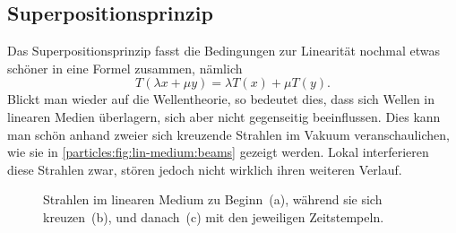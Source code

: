 \subsection{Superpositionsprinzip}\label{particles:section:lin-medium:superposition} %
Das Superpositionsprinzip fasst die Bedingungen zur Linearität nochmal etwas schöner in eine Formel zusammen, 
nämlich
\[
    T(\lambda x + \mu y)
    = 
    \lambda T(x) 
    + 
    \mu T(y).
\]
Blickt man wieder auf die Wellentheorie, so bedeutet dies, 
dass sich Wellen in linearen Medien überlagern, 
sich aber nicht gegenseitig beeinflussen.
Dies kann man schön anhand zweier sich kreuzende Strahlen im Vakuum veranschaulichen, 
wie sie in \autoref{particles:fig:lin-medium:beams} gezeigt werden.
Lokal interferieren diese Strahlen zwar, stören jedoch nicht wirklich ihren weiteren Verlauf.
\begin{figure}
    \centering
    \label{particles:fig:lin-medium:beams-1}\hfill
    \label{particles:fig:lin-medium:beams-2}\hfill
    \label{particles:fig:lin-medium:beams-3}
    \caption{Strahlen im linearen Medium zu Beginn~(a), während sie sich kreuzen~(b), und danach~(c) mit den jeweiligen Zeitstempeln.}\label{particles:fig:lin-medium:beams}
\end{figure}


